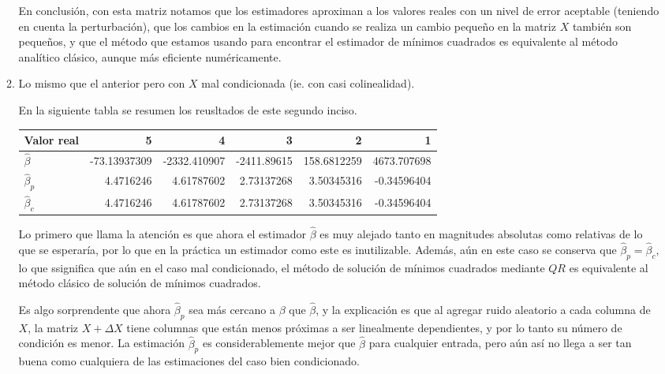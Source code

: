 \documentclass{article}
\begin{document}
\begin{enumerate}
\begin{enumerate}
        En conclusión, con esta matriz notamos que los estimadores aproximan a los valores reales con un nivel de error
        aceptable (teniendo en cuenta la perturbación), que los cambios en la estimación cuando se realiza un cambio
        pequeño en la matriz $X$ también son pequeños, y que el método que estamos usando para encontrar el estimador
        de mínimos cuadrados es equivalente al método analítico clásico, aunque más eficiente numéricamente.

        \item Lo mismo que el anterior pero con $X$ mal condicionada (ie. con casi colinealidad).
        
        En la siguiente tabla se resumen los reusltados de este segundo inciso.

        \begin{center}
            \begin{tabular}{@{}lrrrrr@{}}
                \toprule
                Valor real & 5 & 4 & 3 & 2 & 1 \\ \midrule
                $\hat\beta$ & -73.13937309 & -2332.410907 & -2411.89615 & 158.6812259 & 4673.707698 \\
                $\hat\beta_p$ & 4.4716246 & 4.61787602 & 2.73137268 & 3.50345316 & -0.34596404 \\
                $\hat\beta_c$ & 4.4716246 & 4.61787602 & 2.73137268 & 3.50345316 & -0.34596404 \\ \bottomrule
                \end{tabular}
        \end{center}

        Lo primero que llama la atención es que ahora el estimador $\hat\beta$ es muy alejado tanto en magnitudes absolutas como
        relativas de lo que se esperaría, por lo que en la práctica un estimador como este es inutilizable. Además, aún en 
        este caso se conserva que $\hat\beta_p = \hat\beta_c$, lo que ssignifica que aún en el caso mal condicionado, el método
        de solución de mínimos cuadrados mediante $QR$ es equivalente al método clásico de solución de mínimos cuadrados.

        Es algo sorprendente que ahora $\hat\beta_p$ sea más cercano a $\beta$ que $\hat\beta$, y la explicación es que
        al agregar ruido aleatorio a cada columna de $X$, la matriz $X + \Delta X$ tiene columnas que están menos
        próximas a ser linealmente dependientes, y por lo tanto su número de condición es menor. La estimación $\hat\beta_p$
        es considerablemente mejor que $\hat\beta$ para cualquier entrada, pero aún así no llega a ser tan buena como cualquiera
        de las estimaciones del caso bien condicionado.


\end{enumerate}
\end{enumerate}
\end{document}
